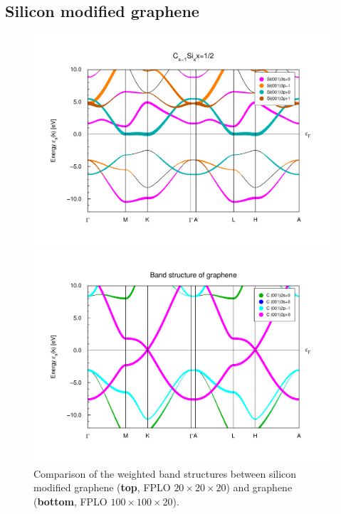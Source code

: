 			\subsection{Silicon modified graphene}
				\begin{figure}
					\begin{minipage}[t]{\textwidth}
						\includegraphics[width=\textwidth]{Results/Silicon/Silicon1R/bweights.pdf}
					\end{minipage}
					\begin{minipage}[t]{\textwidth}
						\includegraphics[width=\textwidth]{Results/Graphene/GrapheneNew/bweights.pdf}
					\end{minipage}	
					\caption{Comparison of the weighted band structures between silicon modified graphene (\textbf{top}, FPLO $20\times20\times20$) and graphene (\textbf{bottom}, FPLO $100\times100\times20$).}
					\label{fig:GrapheneSiliconComparisson}
				\end{figure}

